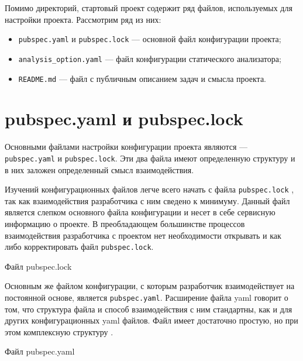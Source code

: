 Помимо директорий, стартовый проект содержит ряд файлов,
используемых для настройки проекта. Рассмотрим ряд из них:

\begin{itemize}
	\item \texttt{pubspec.yaml} и \texttt{pubspec.lock} --- основной файл
		конфигурации проекта;
	\item \texttt{analysis\_option.yaml} --- файл конфигурации
		статического анализатора;
	\item \texttt{README.md} --- файл с публичным описанием задач
		и смысла проекта.
\end{itemize}

\clearpage

\section{pubspec.yaml и pubspec.lock}

Основными файлами настройки конфигурации проекта являются ---
\texttt{pubspec.yaml} и \texttt{pubspec.lock}.
Эти два файла имеют определенную структуру
и в них заложен определенный смысл взаимодействия.\par
Изучений конфигурационных файлов легче всего начать
с файла \texttt{pubspec.lock} ,
так как взаимодействия разработчика с ним сведено к минимуму.
Данный файл является слепком основного файла конфигурации
и несет в себе сервисную информацию о проекте.
В преобладающем большинстве процессов взаимодействия разработчика
с проектом нет необходимости открывать
и как либо корректировать файл \texttt{pubspec.lock}.

\begin{image}
	\caption{Файл pubspec.lock}
	\label{fig:pubspec:lock}
\end{image}

\clearpage

Основным же файлом конфигурации,
с которым разработчик взаимодействует на постоянной основе,
является \texttt{pubspec.yaml}. Расширение файла yaml говорит о том,
что структура файла и способ взаимодействия с ним стандартны,
как и для других конфигурационных yaml файлов. Файл имеет достаточно простую,
но при этом комплексную структуру .

\begin{image}
	\caption{Файл pubspec.yaml}
	\label{fig:pubspec:yaml}
\end{image}

